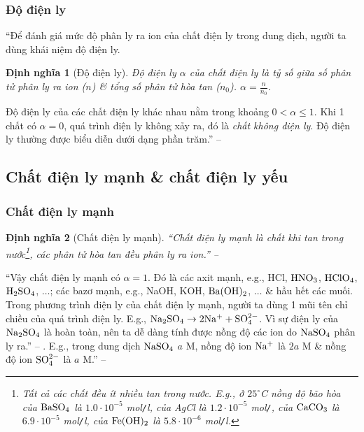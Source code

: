 \documentclass[oneside]{book}
\numberwithin{equation}{section}
\newtheorem{dinhnghia}{Định nghĩa}[section]
\begin{document}
\subsubsection{Độ điện ly}
``Để đánh giá mức độ phân ly ra ion của chất điện ly trong dung dịch, người ta dùng khái niệm độ điện ly.

\begin{dinhnghia}[Độ điện ly]
	\emph{Độ điện ly} $\alpha$ của chất điện ly là tỷ số giữa số phân tử phân ly ra ion ($n$) \& tổng số phân tử hòa tan ($n_0$). $\alpha = \frac{n}{n_0}$.
\end{dinhnghia}
Độ điện ly của các chất điện ly khác nhau nằm trong khoảng $0 < \alpha\le 1$. Khi 1 chất có $\alpha = 0$, quá trình điện ly không xảy ra, đó là \textit{chất không điện ly}. Độ điện ly thường được biểu diễn dưới dạng phần trăm.'' -- \cite[p. 8]{SGK_Hoa_Hoc_11_nang_cao}

\subsection{Chất điện ly mạnh \& chất điện ly yếu}

\subsubsection{Chất điện ly mạnh}

\begin{dinhnghia}[Chất điện ly mạnh]
	``\emph{Chất điện ly mạnh} là chất khi tan trong nước\footnote{Tất cả các chất đều ít nhiều tan trong nước. E.g., ở $25^\circ$C nồng độ bão hòa của $\rm BaSO_4$ là $1.0\cdot 10^{-5}$ mol\texttt{/}l, của AgCl là $1.2\cdot 10^{-5}$ mol\texttt{/}, của $\rm CaCO_3$ là $6.9\cdot 10^{-5}$ mol\texttt{/}l, của $\rm Fe(OH)_2$ là $5.8\cdot 10^{-6}$ mol\texttt{/}l.}, các phân tử hòa tan đều phân ly ra ion.'' -- \cite[p. 9]{SGK_Hoa_Hoc_11_nang_cao}
\end{dinhnghia}
``Vậy chất điện ly mạnh có $\alpha = 1$. Đó là các axit mạnh, e.g., HCl, $\rm HNO_3$, $\rm HClO_4$, $\rm H_2SO_4$, $\ldots$; các bazơ mạnh, e.g., NaOH, KOH, $\rm Ba(OH)_2$, $\ldots$ \& hầu hết các muối. Trong phương trình điện ly của chất điện ly mạnh, người ta dùng 1 mũi tên chỉ chiều của quá trình điện ly. E.g., $\rm Na_2SO_4\to 2Na^+ + SO_4^{2-}$. Vì sự điện ly của $\rm Na_2SO_4$ là hoàn toàn, nên ta dễ dàng tính được nồng độ các ion do $\rm NaSO_4$ phân ly ra.'' -- \cite[p. 8]{SGK_Hoa_Hoc_11_nang_cao}. E.g., trong dung dịch $\rm NaSO_4$ $a$ M, nồng độ ion $\rm Na^+$ là $2a$ M \& nồng độ ion $\rm SO_4^{2-}$ là $a$ M.'' -- \cite[p. 9]{SGK_Hoa_Hoc_11_nang_cao}
\end{document}
